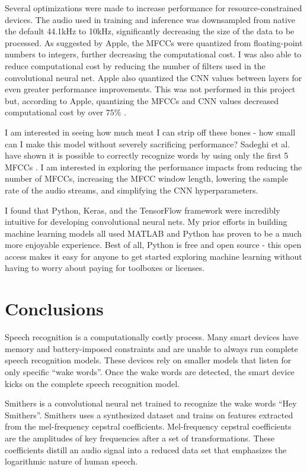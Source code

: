 \documentclass[conference]{IEEEtran}
\begin{document}
Several optimizations were made to increase performance for resource-constrained devices.
The audio used in training and inference was downsampled from native the default 44.1kHz to 10kHz,
significantly decreasing the size of the data to be processed.
As suggested by Apple, the MFCCs were quantized from floating-point numbers to integers,
further decreasing the computational cost.
I was also able to reduce computational cost by reducing the number of filters
used in the convolutional neural net.
Apple also quantized the CNN values between layers for even greater performance improvements.
This was not performed in this project but, according to Apple, quantizing the MFCCs and CNN values
decreased computational cost by over $75\%$ \cite{Efficient}.

I am interested in seeing how much meat I can strip off these bones -
how small can I make this model without severely sacrificing performance?
Sadeghi et al. have shown it is possible to correctly recognize words 
by using only the first 5 MFCCs \cite{optimalmfcc}.
I am interested in exploring the performance impacts from reducing the number of MFCCs,
increasing the MFCC window length, lowering the sample rate of the audio streams,
and simplifying the CNN hyperparameters.

I found that Python, Keras, and the TensorFlow framework
were incredibly intuitive for developing convolutional neural nets.
My prior efforts in building machine learning models all used MATLAB 
and Python has proven to be a much more enjoyable experience.
Best of all, Python is free and open source - this open access
makes it easy for anyone to get started exploring machine learning
without having to worry about paying for toolboxes or licenses.

\section{Conclusions}

Speech recognition is a computationally costly process.
Many smart devices have memory and battery-imposed constraints
and are unable to always run complete speech recognition models.
These devices rely on smaller models that listen for only specific ``wake words''.
Once the wake words are detected, the smart device kicks on
the complete speech recognition model.

Smithers is a convolutional neural net trained to recognize the wake words ``Hey Smithers''.
Smithers uses a synthesized dataset and trains on features extracted from 
the mel-frequency cepstral coefficients.
Mel-frequency cepstral coefficients are the amplitudes of key frequencies
after a set of transformations.
These coefficients distill an audio signal into a reduced data set
that emphasizes the logarithmic nature of human speech.
\end{document}
